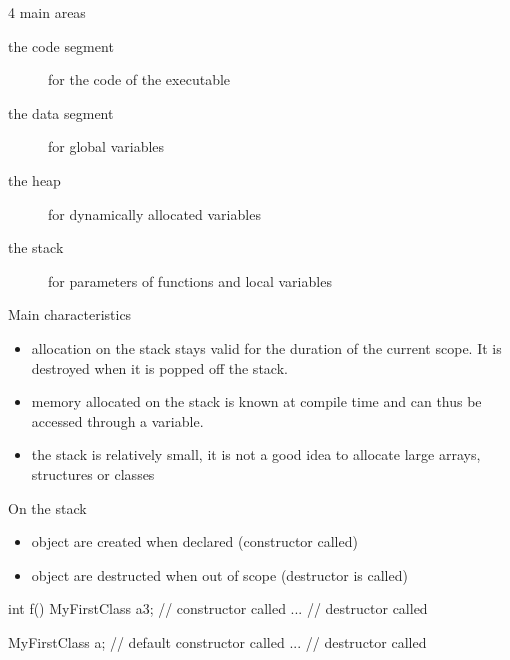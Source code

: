 \begin{frame}[fragile]
  \begin{block}{4 main areas}
    \begin{description}
    \item[the code segment] for the code of the executable
    \item[the data segment] for global variables
    \item[the heap] for dynamically allocated variables
    \item[the stack] for parameters of functions and local variables
    \end{description}
  \end{block}
  \hspace{2.5cm}
\end{frame}

\begin{frame}[fragile]
  \begin{block}{Main characteristics}
    \begin{itemize}
    \item allocation on the stack stays valid for the duration of the current scope.
    It is destroyed when it is popped off the stack.
    \item memory allocated on the stack is known at compile time and can thus be accessed through a variable.
    \item the stack is relatively small, it is not a good idea to allocate large arrays, structures or classes
    \end{itemize}
  \end{block}
\end{frame}

\begin{frame}[fragile]
  \begin{block}{On the stack}
    \begin{itemize}
    \item object are created when declared (constructor called)
    \item object are destructed when out of scope (destructor is called)
    \end{itemize}
  \end{block}
  \begin{cppcode}
    int f() {
      MyFirstClass a{3}; // constructor called
      ...
    } // destructor called

    {
      MyFirstClass a; // default constructor called
      ...
    }  // destructor called
  \end{cppcode}
\end{frame}

